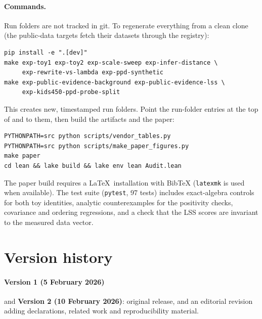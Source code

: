 \documentclass[11pt]{article}
\theoremstyle{plain}
\theoremstyle{definition}
\theoremstyle{remark}
\begin{document}
\paragraph{Commands.} Run folders are not tracked in git. To regenerate everything from a clean clone (the public-data targets fetch their datasets through the registry):
\begin{verbatim}
pip install -e ".[dev]"
make exp-toy1 exp-toy2 exp-scale-sweep exp-infer-distance \
     exp-rewrite-vs-lambda exp-ppd-synthetic
make exp-public-evidence-background exp-public-evidence-lss \
     exp-kids450-ppd-probe-split
\end{verbatim}
This creates new, timestamped run folders. Point the run-folder entries at the top of  and  to them, then build the artifacts and the paper:
\begin{verbatim}
PYTHONPATH=src python scripts/vendor_tables.py
PYTHONPATH=src python scripts/make_paper_figures.py
make paper
cd lean && lake build && lake env lean Audit.lean
\end{verbatim}
The paper build requires a \LaTeX\ installation with BibTeX (\texttt{latexmk} is used when available).
The test suite (\texttt{pytest}, 97 tests) includes exact-algebra controls for both toy identities, analytic counterexamples for the positivity checks, covariance and ordering regressions, and a check that the LSS scores are invariant to the measured data vector.



\section{Version history}\label{app:versions}

\paragraph{Version 1 (5 February 2026)} and \textbf{Version 2 (10 February 2026)}: original release, and an editorial revision adding declarations, related work and reproducibility material.
\end{document}
